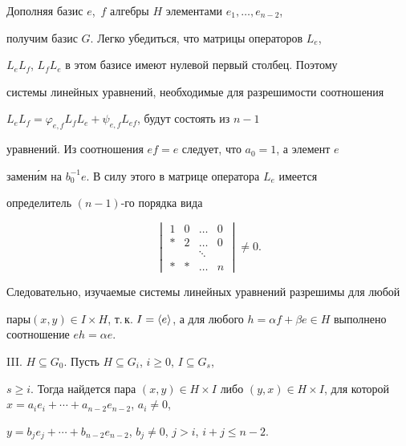 


Дополняя базис $e$,~$f$ алгебры $H$ элементами $e_1,\dotsc,e_{n-2}$, 


получим базис $G$. Легко убедиться, что матрицы операторов $L_e$, 


$L_eL_f$, $L_fL_e$ в этом базисе имеют нулевой первый столбец. Поэтому 


системы линейных уравнений, необходимые для разрешимости соотношения 


$L_eL_f=\varphi_{e,f}L_fL_e+\psi_{e,f}L_{ef}$, будут состоять из $n-1$ 


уравнений. Из соотношения $ef=e$ следует, что $a_0=1$, а элемент $e$ 


замен\'им на $b^{-1}_0e$. В силу этого в матрице оператора $L_e$ имеется 


определитель $(n-1)$-го порядка вида  


$$ 


\begin{vmatrix} 


1 & 0 & \dotsc & 0 \\ 


\ast & 2 & \dotsc & 0 \\ 


\ & \ & \ddots & \ \\ 


\ast & \ast & \dotsc & n 


\end{vmatrix} 


\ne0. 


$$ 


 


Следовательно, изучаемые системы линейных уравнений разрешимы для любой 


пары\linebreak $(x,y)\in I\times H$, т.\,к. $I=\la e\ra$, а для любого $h=\alpha 


f+\beta e\in H$ выполнено соотношение $eh=\alpha e$.  


 


III. $H\subseteq G_0$. Пусть $H\subseteq G_i$, $i\ge0$, $I\subseteq G_s$, 


$s\ge i$. Тогда найдется пара $(x,y)\in H\times I$ либо $(y,x)\in H\times 


I$, для которой $x=a_ie_i+\dotsb+ a_{n-2}e_{n-2}$, $a_i\ne0$, 


$y=b_je_j+\dotsb+ b_{n-2}e_{n-2}$, $b_j\ne0$, $j>i$, $i+j\le n-2$. 


